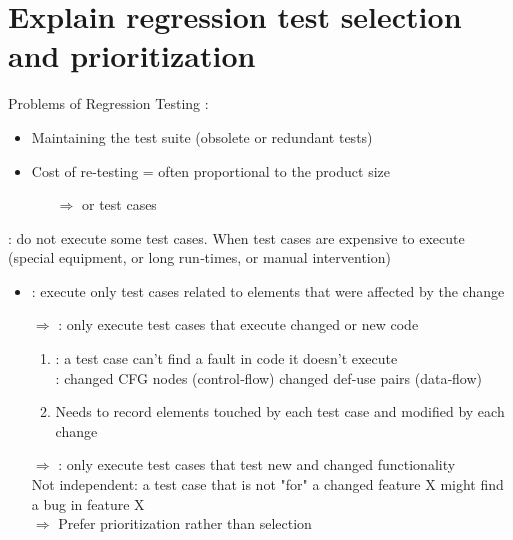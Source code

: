 \newpage
\section{Explain regression test selection and prioritization}

Problems of Regression Testing :
\begin{itemize}
    \item Maintaining the test suite (obsolete or redundant tests)
    \item Cost of re-testing = often proportional to the product size
    \begin{itemize}
         \item [$\Rightarrow$] or  test cases
    \end{itemize}
\end{itemize}

 : do not execute some test cases. When test cases are expensive to execute (special equipment, or long run‐times, or manual intervention)
\begin{itemize}
    \item {}: execute only test cases related to elements that were affected by the change
    \item [$\Rightarrow$]: only execute test cases that execute changed or new code
    \begin{enumerate}
        \item {} : a test case can’t find a fault in code it doesn’t execute\\
         : changed CFG nodes (control‐flow) changed def‐use pairs (data‐flow)
        \item Needs to record elements touched by each test case and modified by each change
    \end{enumerate}
    \item [$\Rightarrow$] : only execute test cases that test new and changed functionality\\ 
    Not independent: a test case that is not "for" a changed feature X might find a bug in feature X\\
    $\Rightarrow$ Prefer prioritization rather than selection
\end{itemize}

